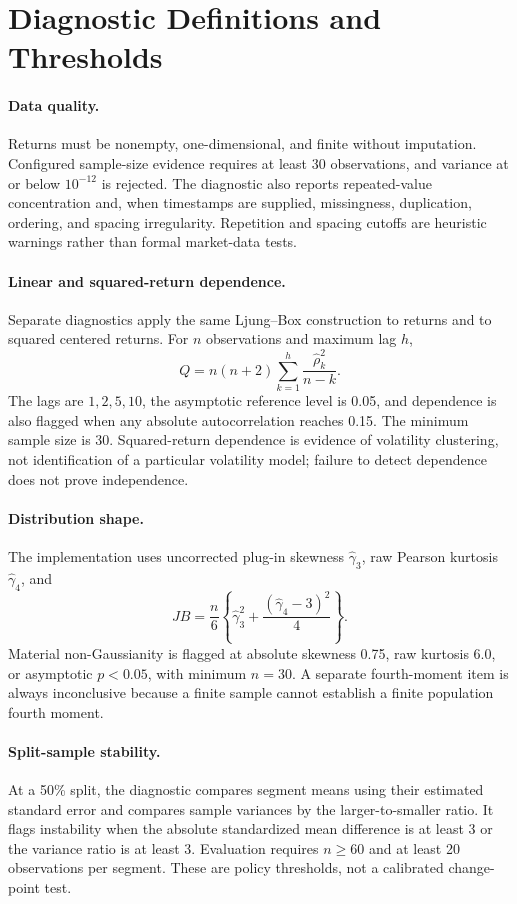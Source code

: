 \section{Diagnostic Definitions and Thresholds}
\label{supp:diagnostics}

\paragraph{Data quality.}
Returns must be nonempty, one-dimensional, and finite without imputation.
Configured sample-size evidence requires at least 30 observations, and
variance at or below \(10^{-12}\) is rejected.  The diagnostic also reports
repeated-value concentration and, when timestamps are supplied, missingness,
duplication, ordering, and spacing irregularity.  Repetition and spacing
cutoffs are heuristic warnings rather than formal market-data tests.

\paragraph{Linear and squared-return dependence.}
Separate diagnostics apply the same Ljung--Box construction to returns and to
squared centered returns.  For \(n\) observations and maximum lag \(h\),
\[
Q=n(n+2)\sum_{k=1}^{h}\frac{\widehat\rho_k^2}{n-k}.
\]
The lags are \(1,2,5,10\), the asymptotic reference level is 0.05, and
dependence is also flagged when any absolute autocorrelation reaches 0.15.
The minimum sample size is 30.  Squared-return dependence is evidence of
volatility clustering, not identification of a particular volatility model;
failure to detect dependence does not prove independence.

\paragraph{Distribution shape.}
The implementation uses uncorrected plug-in skewness
\(\widehat\gamma_3\), raw Pearson kurtosis \(\widehat\gamma_4\), and
\[
JB=\frac{n}{6}\left\{\widehat\gamma_3^2+
\frac{(\widehat\gamma_4-3)^2}{4}\right\}.
\]
Material non-Gaussianity is flagged at absolute skewness 0.75, raw kurtosis
6.0, or asymptotic \(p<0.05\), with minimum \(n=30\).  A separate
fourth-moment item is always inconclusive because a finite sample cannot
establish a finite population fourth moment.

\paragraph{Split-sample stability.}
At a 50\% split, the diagnostic compares segment means using their estimated
standard error and compares sample variances by the larger-to-smaller ratio.
It flags instability when the absolute standardized mean difference is at
least 3 or the variance ratio is at least 3.  Evaluation requires \(n\geq60\)
and at least 20 observations per segment.  These are policy thresholds, not a
calibrated change-point test.

